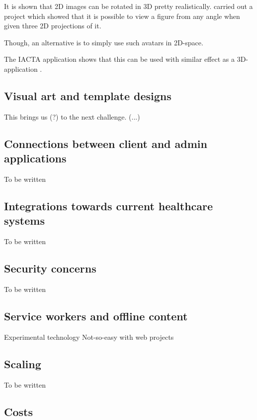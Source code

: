It is shown that 2D images can be rotated in 3D pretty realistically. \textcite{rivers2010} carried out a project which showed that it is possible to view a figure from any angle when given three 2D projections of it.

Though, an alternative is to simply use such avatars in 2D-space. 

The IACTA application shows that this can be used with similar effect as a 3D-application \parencite{stalberg2018}.

\subsection{Visual art and template designs}

This brings us (?) to the next challenge. (...)

\subsection{Connections between client and admin applications}

To be written

\subsection{Integrations towards current healthcare systems}

To be written

\subsection{Security concerns}

To be written

\subsection{Service workers and offline content}

Experimental technology
Not-so-easy with web projects

\subsection{Scaling}

To be written

\subsection{Costs}


